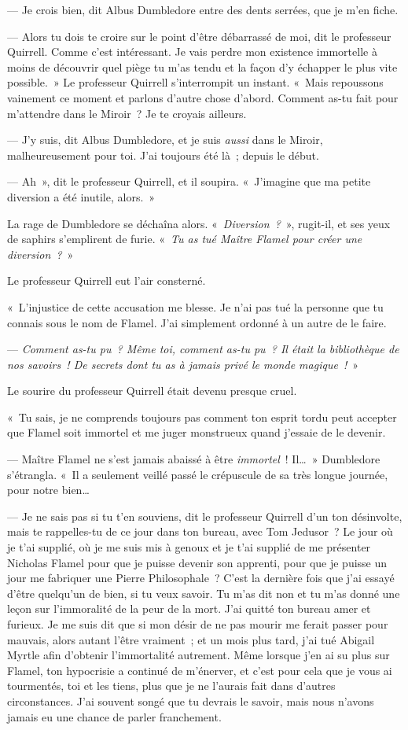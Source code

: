 --- Je crois bien, dit Albus Dumbledore entre des dents serrées, que je m'en fiche.

--- Alors tu dois te croire sur le point d'être débarrassé de moi, dit le professeur Quirrell.
Comme c'est intéressant.
Je vais perdre mon existence immortelle à moins de découvrir quel piège tu m'as tendu et la façon d'y échapper le plus vite possible.~»
Le professeur Quirrell s'interrompit un instant.
«~Mais repoussons vainement ce moment et parlons d'autre chose d'abord.
Comment as-tu fait pour m'attendre dans le Miroir~?
Je te croyais ailleurs.

--- J'y suis, dit Albus Dumbledore, et je suis \emph{aussi} dans le Miroir, malheureusement pour toi.
J'ai toujours été là~; depuis le début.

--- Ah~», dit le professeur Quirrell, et il soupira.
«~J'imagine que ma petite diversion a été inutile, alors.~»

La rage de Dumbledore se déchaîna alors.
«~\emph{Diversion~?}~», rugit-il, et ses yeux de saphirs s'emplirent de furie.
«~\emph{Tu as tué Maître Flamel pour créer une diversion~?}~»

Le professeur Quirrell eut l'air consterné.

«~L'injustice de cette accusation me blesse.
Je n'ai pas tué la personne que tu connais sous le nom de Flamel.
J'ai simplement ordonné à un autre de le faire.

--- \emph{Comment as-tu pu~?
Même toi, comment as-tu pu~?
Il était la bibliothèque de nos savoirs~!
De secrets dont tu as à jamais privé le monde magique~!}~»

Le sourire du professeur Quirrell était devenu presque cruel.

«~Tu sais, je ne comprends toujours pas comment ton esprit tordu peut accepter que Flamel soit immortel et me juger monstrueux quand j'essaie de le devenir.

--- Maître Flamel ne s'est jamais abaissé à être \emph{immortel}~!
Il…~» Dumbledore s'étrangla.
«~Il a seulement veillé passé le crépuscule de sa très longue journée, pour notre bien…

--- Je ne sais pas si tu t'en souviens, dit le professeur Quirrell d'un ton désinvolte, mais te rappelles-tu de ce jour dans ton bureau, avec Tom Jedusor~?
Le jour où je t'ai supplié, où je me suis mis à genoux et je t'ai supplié de me présenter Nicholas Flamel pour que je puisse devenir son apprenti, pour que je puisse un jour me fabriquer une Pierre Philosophale~?
C'est la dernière fois que j'ai essayé d'être quelqu'un de bien, si tu veux savoir.
Tu m'as dit non et tu m'as donné une leçon sur l'immoralité de la peur de la mort.
J'ai quitté ton bureau amer et furieux.
Je me suis dit que si mon désir de ne pas mourir me ferait passer pour mauvais, alors autant l'être vraiment~; et un mois plus tard, j'ai tué Abigail Myrtle afin d'obtenir l'immortalité autrement.
Même lorsque j'en ai su plus sur Flamel, ton hypocrisie a continué de m'énerver, et c'est pour cela que je vous ai tourmentés, toi et les tiens, plus que je ne l'aurais fait dans d'autres circonstances.
J'ai souvent songé que tu devrais le savoir, mais nous n'avons jamais eu une chance de parler franchement.


